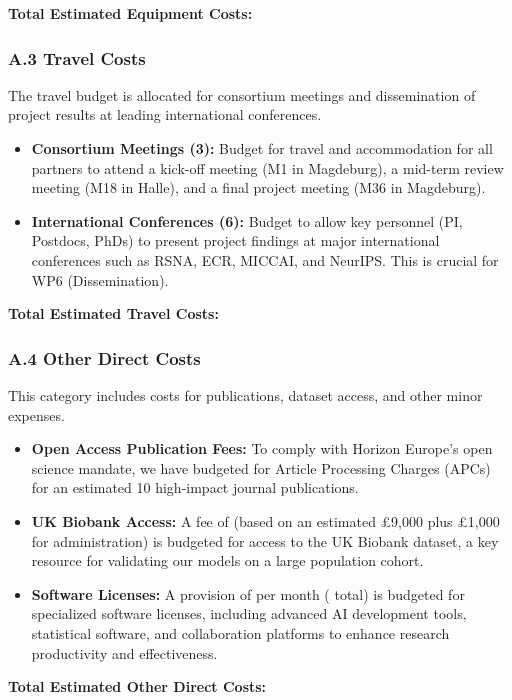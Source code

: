 \textbf{Total Estimated Equipment Costs: }

\subsubsection*{A.3 Travel Costs}
The travel budget is allocated for consortium meetings and dissemination of project results at leading international conferences.
\begin{itemize}
    \item \textbf{Consortium Meetings (3):} Budget for travel and accommodation for all partners to attend a kick-off meeting (M1 in Magdeburg), a mid-term review meeting (M18 in Halle), and a final project meeting (M36 in Magdeburg).
    \item \textbf{International Conferences (6):} Budget to allow key personnel (PI, Postdocs, PhDs) to present project findings at major international conferences such as RSNA, ECR, MICCAI, and NeurIPS. This is crucial for WP6 (Dissemination).
\end{itemize}

\textbf{Total Estimated Travel Costs: }

\subsubsection*{A.4 Other Direct Costs}
This category includes costs for publications, dataset access, and other minor expenses.
\begin{itemize}
    \item \textbf{Open Access Publication Fees:} To comply with Horizon Europe's open science mandate, we have budgeted for Article Processing Charges (APCs) for an estimated 10 high-impact journal publications.
    \item \textbf{UK Biobank Access:} A fee of  (based on an estimated \pounds9,000 plus \pounds1,000 for administration) is budgeted for access to the UK Biobank dataset, a key resource for validating our models on a large population cohort.
    \item \textbf{Software Licenses:} A provision of  per month ( total) is budgeted for specialized software licenses, including advanced AI development tools, statistical software, and collaboration platforms to enhance research productivity and effectiveness.
\end{itemize}

\textbf{Total Estimated Other Direct Costs: }

